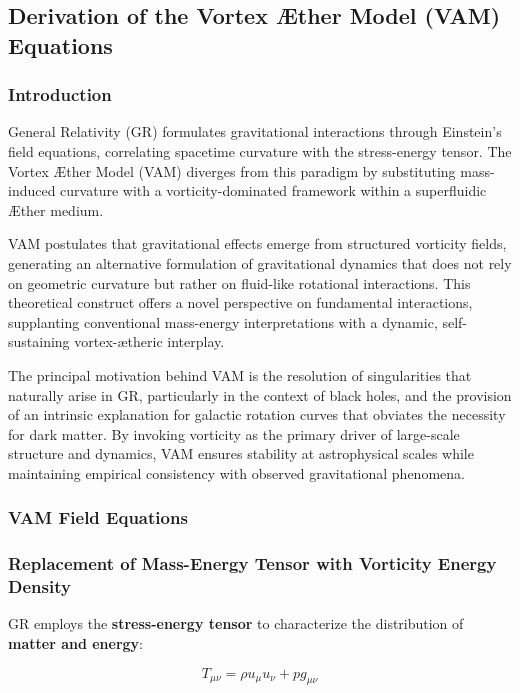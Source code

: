 \subsection{Derivation of the Vortex Æther Model (VAM) Equations}

\subsubsection*{Introduction}
General Relativity (GR) formulates gravitational interactions through Einstein's field equations, correlating spacetime curvature with the stress-energy tensor. The Vortex Æther Model (VAM) diverges from this paradigm by substituting mass-induced curvature with a vorticity-dominated framework within a superfluidic Æther medium.

VAM postulates that gravitational effects emerge from structured vorticity fields, generating an alternative formulation of gravitational dynamics that does not rely on geometric curvature but rather on fluid-like rotational interactions. This theoretical construct offers a novel perspective on fundamental interactions, supplanting conventional mass-energy interpretations with a dynamic, self-sustaining vortex-ætheric interplay.

The principal motivation behind VAM is the resolution of singularities that naturally arise in GR, particularly in the context of black holes, and the provision of an intrinsic explanation for galactic rotation curves that obviates the necessity for dark matter. By invoking vorticity as the primary driver of large-scale structure and dynamics, VAM ensures stability at astrophysical scales while maintaining empirical consistency with observed gravitational phenomena.

\subsubsection*{VAM Field Equations}


\subsubsection*{Replacement of Mass-Energy Tensor with Vorticity Energy Density}
GR employs the \textbf{stress-energy tensor} to characterize the distribution of \textbf{matter and energy}:

\begin{equation*}
    T_{\mu\nu} = \rho u_\mu u_\nu + p g_{\mu\nu}
\end{equation*}

